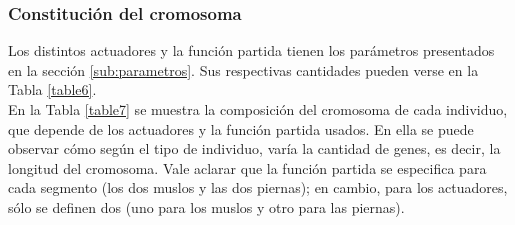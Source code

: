\documentclass{article}
\begin{document}
\subsubsection{Constituci\'on del cromosoma}
Los distintos actuadores y la funci\'on partida tienen los par\'ametros presentados en la secci\'on \ref{sub:parametros}. Sus respectivas cantidades pueden verse en la Tabla \ref{table6}.\\
En la Tabla \ref{table7} se muestra la composici\'on del cromosoma de cada individuo, que depende de los actuadores y la funci\'on partida usados. En ella se puede observar c\'omo seg\'un el tipo de individuo, var\'ia la cantidad de genes, es decir, la longitud del cromosoma. Vale aclarar que la funci\'on partida se especifica para cada segmento (los dos muslos y las dos piernas); en cambio, para los actuadores, s\'olo se definen dos (uno para los muslos y otro para las piernas). \\

\begin{table}[H]%
  \centering
  \captionsetup{justification=centering}
  \caption{Cantidad de par\'ametros seg\'un tipo de actuador y funci\'on partida }%
  \label{table6}%
\end{table}
\end{document}
